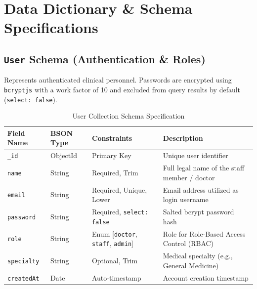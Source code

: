 \documentclass[12pt,a4paper,oneside]{report}
\begin{document}
\section{Data Dictionary \& Schema Specifications}

\subsection{\texttt{User} Schema (Authentication \& Roles)}
Represents authenticated clinical personnel. Passwords are encrypted using \texttt{bcryptjs} with a work factor of 10 and excluded from query results by default (\texttt{select: false}).
\begin{table}[h!]
\centering
\caption{User Collection Schema Specification}
\small
\begin{tabularx}{\textwidth}{l l l X}
\toprule
\textbf{Field Name} & \textbf{BSON Type} & \textbf{Constraints} & \textbf{Description} \\
\midrule
\texttt{\_id} & ObjectId & Primary Key & Unique user identifier \\
\texttt{name} & String & Required, Trim & Full legal name of the staff member / doctor \\
\texttt{email} & String & Required, Unique, Lower & Email address utilized as login username \\
\texttt{password} & String & Required, \texttt{select: false} & Salted bcrypt password hash \\
\texttt{role} & String & Enum [\texttt{doctor}, \texttt{staff}, \texttt{admin}] & Role for Role-Based Access Control (RBAC) \\
\texttt{specialty} & String & Optional, Trim & Medical specialty (e.g., General Medicine) \\
\texttt{createdAt} & Date & Auto-timestamp & Account creation timestamp \\
\bottomrule
\end{tabularx}
\end{table}
\end{document}
